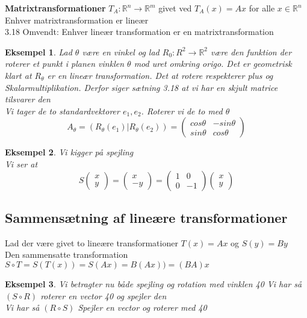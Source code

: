 \documentclass[a4paper,fleqn]{report}
\newcommand{\RR}{\mathbb{R}}
\newtheorem{example}{Eksempel}[chapter]
\begin{document}
	\textbf{Matrixtransformationer}
	$T_A: \RR^n \rightarrow \RR^m$ givet ved $T_A(x) = Ax$ for alle $x \in \RR^n$\\
	Enhver matrixtransformation er lineær\\
	3.18 Omvendt: Enhver lineær transformation er en matrixtransformation\\

	\begin{example}
		Lad $\theta$ være en vinkel og lad $R_0:R^2 \rightarrow \RR^2$ være den funktion der
		roterer et punkt i planen vinklen $\theta$ mod uret omkring origo. Det er
		geometrisk klart at $R_\theta$ er en lineær transformation. Det at rotere  
		respekterer plus og Skalarmultiplikation. Derfor siger sætning 3.18 at vi har
		en skjult matrice tilsvarer den\\

		Vi tager de to standardvektorer $e_1, e_2$. Roterer vi de to med $\theta$
		\[A_\theta = (R_\theta(e_1) | R_\theta(e_2)) = \begin{pmatrix}cos \theta&-sin\theta\\
		sin\theta&cos\theta\end{pmatrix}\]
	\end{example}
	\begin{example}
		Vi kigger på spejling\\
		Vi ser at \[ S\begin{pmatrix}x\\y\end{pmatrix} = \begin{pmatrix}x\\-y\end{pmatrix}
		= \begin{pmatrix}1&0\\0&-1\end{pmatrix}\begin{pmatrix}x\\y\end{pmatrix}\]
	\end{example}
	\subsection{Sammensætning af lineære transformationer}
	Lad der være givet to lineære transformationer $T(x) = Ax$ og $S(y)=By$\\
	Den sammensatte transformation $S \circ T = S(T(x)) = S(Ax) = B(Ax)) = (BA)x$

	\begin{example}
		Vi betragter nu både spejling og rotation med vinklen 40
		Vi har så $(S\circ R)$ roterer en vector 40 og spejler den\\
		Vi har så $(R\circ S)$ Spejler en vector og roterer med 40\\
	\end{example}
\end{document}
